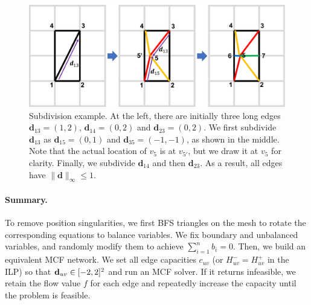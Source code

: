 \begin{figure}
\centering
\includegraphics[width=0.6\linewidth]{quadriflow/diagram/subdivide.pdf}
\caption{Subdivision example. At the left, there are initially three long edges ${\textbf{d}}_{13}=(1,2)$, ${\textbf{d}}_{14}=(0,2)$ and ${\textbf{d}}_{23}=(0,2)$. We first subdivide ${\textbf{d}}_{13}$ as ${\textbf{d}}_{15}=(0,1)$ and ${\textbf{d}}_{35}=(-1,-1)$, as shown in the middle. Note that the actual location of $v_5$ is at $v_{5'}$, but we draw it at $v_5$ for clarity. Finally, we subdivide ${\textbf{d}}_{14}$ and then ${\textbf{d}}_{23}$. As a result, all edges have $\|{\textbf{d}}\|_{\infty}\leq 1$.}
\label{fig:quad-subdivide}
\end{figure}

\paragraph*{Summary.}
To remove position singularities, we first BFS triangles on the mesh to rotate the corresponding equations to balance variables. We fix boundary and unbalanced variables, and randomly modify them to achieve $\sum_{i=1}^n b_i=0$. Then, we build an equivalent MCF network. We set all edge capacities $c_{uv}$ (or $H^-_{uv}=H^+_{uv}$ in the ILP) so that $\mathbf{d}_{uv} \in [-2,2]^2$ and run an MCF solver. If it returns infeasible, we retain the flow value $f$ for each edge and repeatedly increase the capacity until the problem is feasible.

%

